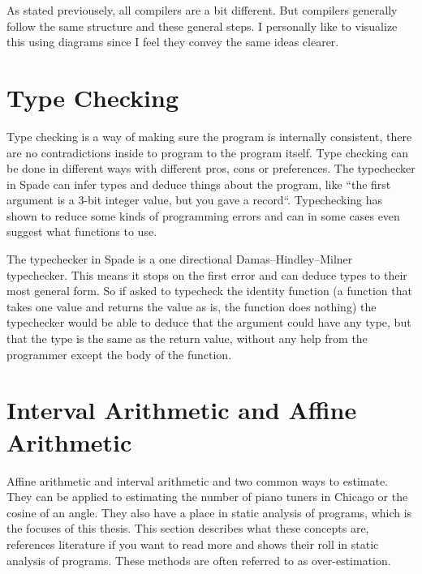 \documentclass[msc,lith,english]{liuthesis}
\begin{document}
\cite{src:DragonBook}\cite{src:LecturesOnCompilers}

As stated previousely, all compilers are a bit different. But compilers generally follow the same structure and these general steps. I personally like to visualize this using diagrams since I feel they convey the same ideas clearer.


\section{Type Checking} %
\label{sec:TypeChecking}
Type checking is a way of making sure the program is internally consistent, there are no contradictions inside to program to the program itself. Type checking can be done in different ways with different pros, cons or preferences. The typechecker in Spade can infer types and deduce things about the program, like ``the first argument is a 3-bit integer value, but you gave a record``. Typechecking has shown to reduce some kinds of programming errors and can in some cases even suggest what functions to use.

The typechecker in Spade is a one directional Damas–Hindley–Milner typechecker. This means it stops on the first error and can deduce types to their most general form. So if asked to typecheck the identity function (a function that takes one value and returns the value as is, the function does nothing) the typechecker would be able to deduce that the argument could have any type, but that the type is the same as the return value, without any help from the programmer except the body of the function. \cite{src:DamasHindleyMilner}

\cite{src:TypeCheckersBook}

\section{Interval Arithmetic and Affine Arithmetic}
\label{sec:IAandAA}
Affine arithmetic and interval arithmetic and two common ways to estimate. They can be applied to estimating the number of piano tuners in Chicago or the cosine of an angle. They also have a place in static analysis of programs, which is the focuses of this thesis. This section describes what these concepts are, references literature if you want to read more and shows their roll in static analysis of programs. These methods are often referred to as over-estimation.
\end{document}

